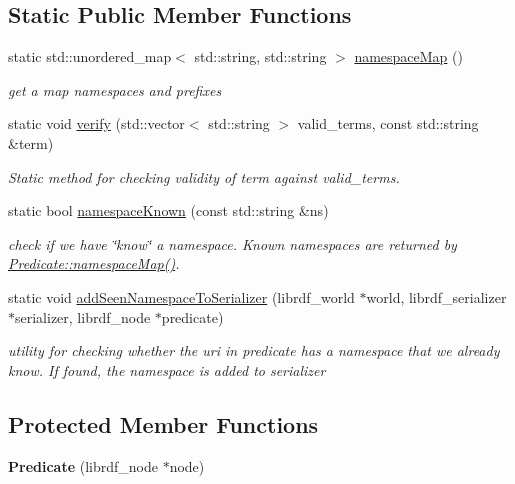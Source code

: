 \subsection*{Static Public Member Functions}
\begin{DoxyCompactItemize}
\item 
static std\+::unordered\+\_\+map$<$ std\+::string, std\+::string $>$ \hyperlink{classomexmeta_1_1Predicate_a1291e3cd9727871f568e864e0f5af3f0}{namespace\+Map} ()
\begin{DoxyCompactList}\small\item\em get a map namespaces and prefixes \end{DoxyCompactList}\item 
static void \hyperlink{classomexmeta_1_1Predicate_a1e7e59b8a48c9f89eeec73f3bbaea19c}{verify} (std\+::vector$<$ std\+::string $>$ valid\+\_\+terms, const std\+::string \&term)
\begin{DoxyCompactList}\small\item\em Static method for checking validity of term against valid\+\_\+terms. \end{DoxyCompactList}\item 
static bool \hyperlink{classomexmeta_1_1Predicate_a8381c8b0c7bbaa27de29608cbff08bf5}{namespace\+Known} (const std\+::string \&ns)
\begin{DoxyCompactList}\small\item\em check if we have \char`\"{}know\char`\"{} a namespace. Known namespaces are returned by \hyperlink{classomexmeta_1_1Predicate_a1291e3cd9727871f568e864e0f5af3f0}{Predicate\+::namespace\+Map()}. \end{DoxyCompactList}\item 
\mbox{\label{classomexmeta_1_1Predicate_a4cda551beb4e1354ac56d692f0eb78cd}} 
static void \hyperlink{classomexmeta_1_1Predicate_a4cda551beb4e1354ac56d692f0eb78cd}{add\+Seen\+Namespace\+To\+Serializer} (librdf\+\_\+world $\ast$world, librdf\+\_\+serializer $\ast$serializer, librdf\+\_\+node $\ast$predicate)
\begin{DoxyCompactList}\small\item\em utility for checking whether the uri in  predicate has a namespace that we already know. If found, the namespace is added to  serializer \end{DoxyCompactList}\end{DoxyCompactItemize}
\subsection*{Protected Member Functions}
\begin{DoxyCompactItemize}
\item 
\mbox{\label{classomexmeta_1_1Predicate_a157c4e95f9869d4f22cd07332ff7621a}} 
{\bfseries Predicate} (librdf\+\_\+node $\ast$node)
\end{DoxyCompactItemize}
